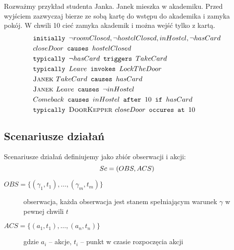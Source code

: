 \begin{example}\label{przyk:syntaktyka_jezyka_akcji}
	Rozważmy przykład studenta Janka. Janek mieszka w akademiku.
	Przed wyjściem zazwyczaj bierze ze sobą kartę do wstępu do akademika i zamyka pokój.
	W chwili 10 cieć zamyka akademik i można wejść tylko z kartą.
	\begin{align*}
	&\texttt{initially } \neg roomClosed, \neg hostelClosed, inHostel, \neg hasCard \\
	&closeDoor \texttt{ causes } hostelClosed \\
	&\texttt{typically } \neg hasCard \texttt{ triggers } TakeCard \\
	&\texttt{typically } Leave \texttt{ invokes } LockTheDoor \\
	&\textsc{Janek } TakeCard \texttt{ causes } hasCard \\
	&\textsc{Janek } Leave \texttt{ causes } \neg inHostel \\
	&Comeback \texttt{ causes } inHostel \texttt{ after } 10 \texttt{ if } hasCard \\
	&\texttt{typically } \textsc{DoorKepper } closeDoor \texttt{ occures at } 10
	\end{align*}
\end{example}


\subsection{Scenariusze działań}
\begin{definition}
Scenariusze działań definiujemy jako zbiór obserwacji i akcji:
\begin{equation}
	Sc = (OBS, ACS)\\
\end{equation}
\begin{description}
	\item[$OBS = \lbrace(\gamma_1, t_1), \dots, (\gamma_m, t_m)\rbrace$]
	obserwacja, każda obserwacja jest stanem spełniającym warunek $\gamma$ w pewnej chwili $t$
	\item[$ACS = \lbrace(a_1, t_1), \dots, (a_n, t_n) \rbrace$]
	gdzie $a_i$ -- akcje, $t_i$ -- punkt w czasie rozpoczęcia akcji
\end{description}
\end{definition}

